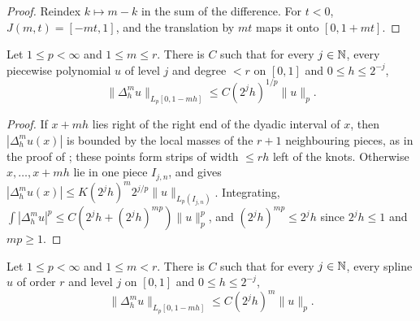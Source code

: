 \begin{proof}
\leanok
Reindex $k \mapsto m - k$ in the sum of the difference. For $t < 0$, $J(m, t) = [-mt, 1]$, and the
translation by $mt$ maps it onto $[0, 1 + mt]$.
\end{proof}

\begin{theorem}
\label{thm:pp-lower-diff}
\leanok
{}
Let $1 \leq p < \infty$ and $1 \leq m \leq r$. There is $C$ such that for every $j \in \mathbb{N}$, every
piecewise polynomial $u$ of level $j$ and degree $< r$ on $[0, 1]$ and $0 \leq h \leq 2^{-j}$,
\[
  \|\Delta_h^m u\|_{L_p[0, 1 - mh]} \leq C (2^j h)^{1/p} \|u\|_p .
\]
\end{theorem}

\begin{proof}
\leanok
If $x + mh$ lies right of the right end of the dyadic interval of $x$, then $|\Delta_h^m u(x)|$ is
bounded by the local masses of the $r + 1$ neighbouring pieces, as in the proof of
; these points form strips of width $\leq rh$ left of the knots. Otherwise
$x, \dots, x + mh$ lie in one piece $I_{j,n}$, and  gives
$|\Delta_h^m u(x)| \leq K (2^j h)^m 2^{j/p} \|u\|_{L_p(I_{j,n})}$. Integrating,
$\int |\Delta_h^m u|^p \leq C (2^j h + (2^j h)^{mp}) \|u\|_p^p$, and $(2^j h)^{mp} \leq 2^j h$
since $2^j h \leq 1$ and $mp \geq 1$.
\end{proof}

\begin{theorem}
\label{thm:spline-lower-diff}
\leanok
{}
Let $1 \leq p < \infty$ and $1 \leq m < r$. There is $C$ such that for every $j \in \mathbb{N}$, every
spline $u$ of order $r$ and level $j$ on $[0, 1]$ and $0 \leq h \leq 2^{-j}$,
\[
  \|\Delta_h^m u\|_{L_p[0, 1 - mh]} \leq C (2^j h)^m \|u\|_p .
\]
\end{theorem}

